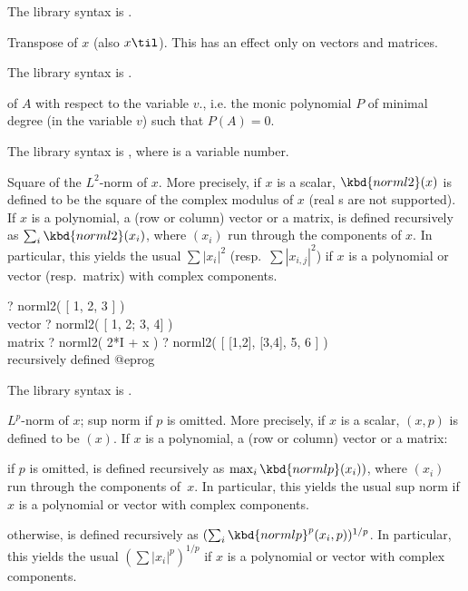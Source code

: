 The library syntax is .

\label{se:mattranspose}
Transpose of $x$ (also $x\til$).
This has an effect only on vectors and matrices.

The library syntax is .

\label{se:minpoly}
of $A$ with respect to the variable $v$., i.e. the monic polynomial $P$
of minimal degree (in the variable $v$) such that $P(A) = 0$.

The library syntax is , where  is a variable number.

\label{se:norml2}
Square of the $L^2$-norm of $x$. More precisely,
if $x$ is a scalar, $\kbd{norml2}(x)$ is defined to be the square
of the complex modulus of $x$ (real s are not supported).
If $x$ is a polynomial, a (row or column) vector or a matrix,  is
defined recursively as $\sum_i \kbd{norml2}(x_i)$, where $(x_i)$ run through
the components of $x$. In particular, this yields the usual $\sum |x_i|^2$
(resp.~$\sum |x_{i,j}|^2$) if $x$ is a polynomial or vector (resp.~matrix) with
complex components.

\bprog
? norml2( [ 1, 2, 3 ] )      \\ vector
? norml2( [ 1, 2; 3, 4] )   \\ matrix
? norml2( 2*I + x )
? norml2( [ [1,2], [3,4], 5, 6 ] )   \\ recursively defined
@eprog

The library syntax is .

\label{se:normlp}
$L^p$-norm of $x$; sup norm if $p$ is omitted. More precisely,
if $x$ is a scalar, $(x, p)$ is defined to be $(x)$.
If $x$ is a polynomial, a (row or column) vector or a matrix:

\item  if $p$ is omitted,  is defined recursively as
$\max_i \kbd{normlp}(x_i))$, where $(x_i)$ run through the components of~$x$.
In particular, this yields the usual sup norm if $x$ is a polynomial or
vector with complex components.

\item otherwise,  is defined recursively as $(\sum_i
\kbd{normlp}^p(x_i,p))^{1/p}$. In particular, this yields the usual $(\sum
|x_i|^p)^{1/p}$ if $x$ is a polynomial or vector with complex components.

